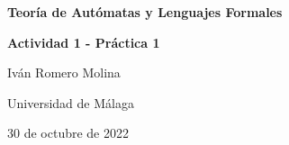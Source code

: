 \documentclass[16]{article} %
\begin{document}
\begin{titlepage} %
	\centering  %
	{\bfseries\Huge Teoría de Autómatas y Lenguajes Formales\par}
   	\vspace{2cm} %
    {\bfseries\huge Actividad 1 - Práctica 1\par}
    \vfill %
    {\huge Iván Romero Molina\par}
    \vspace{1cm}
    {\Large Universidad de Málaga\par}
    \vspace{1cm}
    {\large 30 de octubre de 2022\par}
\end{titlepage}
    
\newpage
\end{document}
